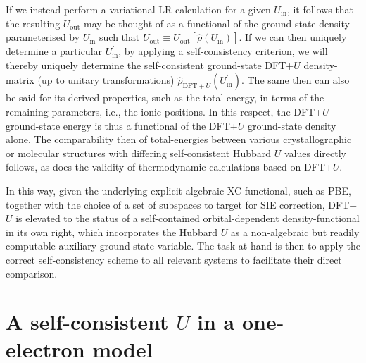 If we instead perform a variational LR calculation 
for a given $U_\textrm{in}$, 
it follows that  the resulting  $U_\textrm{out} $ 
may be thought of as a functional of the ground-state 
density parameterised 
by $U_\textrm{in}$ such that 
$U_\textrm{out}\equiv U_\textrm{out}\left[\hat{\rho}(U_\textrm{in})\right]$.
%
If we can then uniquely determine {a particular}
$U_\textrm{in}^\prime$, 
by applying a self-consistency criterion, 
we will thereby uniquely determine the self-consistent ground-state 
DFT+$U$ density-matrix (up to  unitary transformations)
$\hat{\rho}_{\textrm{DFT}+U} ( U_\textrm{in}^\prime )$.
%
The same then can also be said for its derived
properties, such as the total-energy, 
in terms of the remaining  parameters, 
i.e., the ionic positions.
%
In this respect, the DFT+$U$ ground-state energy 
is thus a functional of the DFT+$U$ ground-state density alone.
%
The comparability {then} 
of total-energies between 
various crystallographic 
or molecular structures with  differing 
self-consistent Hubbard $U$ values directly follows, 
as does the validity of thermodynamic calculations 
based on DFT+$U$.

In this way, 
given the underlying explicit algebraic 
XC functional, such as PBE, 
together with the choice of a set of
subspaces to target for SIE correction, 
DFT+$U$ is elevated to the status of a 
self-contained  orbital-dependent 
density-functional in its own right,  
which incorporates the Hubbard $U$ as a non-algebraic 
but readily computable auxiliary ground-state variable. 
%
The task at hand is then to apply the correct 
self-consistency scheme to all relevant systems  
to facilitate their direct comparison.


\section{A self-consistent $U$ in a one-electron model}

